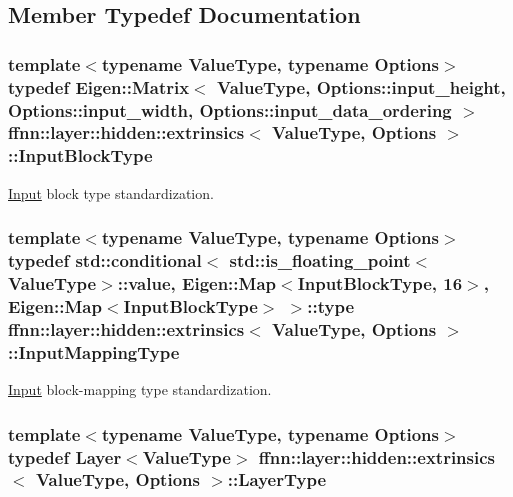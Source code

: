 \subsection{Member Typedef Documentation}
\hypertarget{structffnn_1_1layer_1_1hidden_1_1extrinsics_af5299a48a27726ba0d407ecb28890092}{
\subsubsection[{Input\-Block\-Type}]{\setlength{\rightskip}{0pt plus 5cm}template$<$typename Value\-Type, typename Options$>$ typedef Eigen\-::\-Matrix$<$ Value\-Type, Options\-::input\-\_\-height, Options\-::input\-\_\-width, Options\-::input\-\_\-data\-\_\-ordering $>$ {\bf ffnn\-::layer\-::hidden\-::extrinsics}$<$ Value\-Type, Options $>$\-::{\bf Input\-Block\-Type}}}\label{structffnn_1_1layer_1_1hidden_1_1extrinsics_af5299a48a27726ba0d407ecb28890092}


\hyperlink{classffnn_1_1layer_1_1_input}{Input} block type standardization. 

\hypertarget{structffnn_1_1layer_1_1hidden_1_1extrinsics_a62256f740b1aaf253c9992d15cda7eab}{
\subsubsection[{Input\-Mapping\-Type}]{\setlength{\rightskip}{0pt plus 5cm}template$<$typename Value\-Type, typename Options$>$ typedef std\-::conditional$<$ std\-::is\-\_\-floating\-\_\-point$<$Value\-Type$>$\-::value, Eigen\-::\-Map$<${\bf Input\-Block\-Type}, 16$>$, Eigen\-::\-Map$<${\bf Input\-Block\-Type}$>$ $>$\-::type {\bf ffnn\-::layer\-::hidden\-::extrinsics}$<$ Value\-Type, Options $>$\-::{\bf Input\-Mapping\-Type}}}\label{structffnn_1_1layer_1_1hidden_1_1extrinsics_a62256f740b1aaf253c9992d15cda7eab}


\hyperlink{classffnn_1_1layer_1_1_input}{Input} block-\/mapping type standardization. 

\hypertarget{structffnn_1_1layer_1_1hidden_1_1extrinsics_a06f383c22ed682751b9a4cb8855da9eb}{
\subsubsection[{Layer\-Type}]{\setlength{\rightskip}{0pt plus 5cm}template$<$typename Value\-Type, typename Options$>$ typedef {\bf Layer}$<$Value\-Type$>$ {\bf ffnn\-::layer\-::hidden\-::extrinsics}$<$ Value\-Type, Options $>$\-::{\bf Layer\-Type}}}\label{structffnn_1_1layer_1_1hidden_1_1extrinsics_a06f383c22ed682751b9a4cb8855da9eb}


